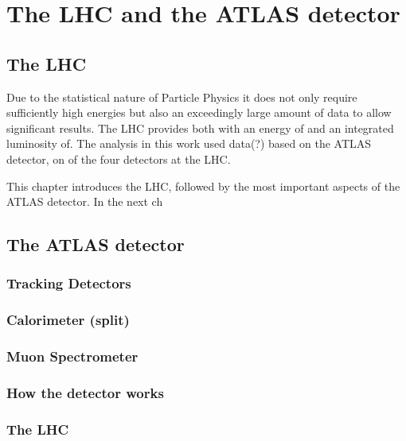 \chapter{The LHC and the ATLAS detector}
\section{The LHC}

Due to the statistical nature of Particle Physics it does not only require sufficiently high energies but also an exceedingly large amount of data to allow significant results.
The LHC provides both with an energy of and an integrated luminosity of.
The analysis in this work used data(?) based on the ATLAS detector, on of the four detectors at the LHC.

This chapter introduces the LHC, followed by the most important aspects of the ATLAS detector. In the next ch

\section{The ATLAS detector}

\subsection{Tracking Detectors}

\subsection{Calorimeter (split)}

\subsection{Muon Spectrometer}

\subsection{How the detector works}

\subsection{The LHC}

